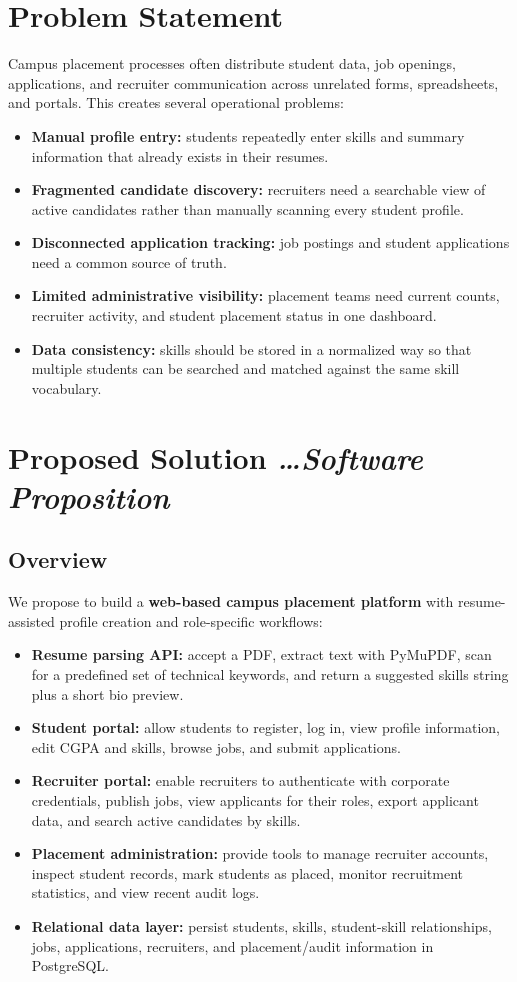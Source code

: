\documentclass[11pt,a4paper]{article}
\newcommand{\BvrHint}[1]{%
  {\normalfont\normalsize\itshape\hfill #1}}
\begin{document}
\section{Problem Statement}
Campus placement processes often distribute student data, job openings, applications, and recruiter communication across unrelated forms, spreadsheets, and portals. This creates several operational problems:
\begin{itemize}[leftmargin=0.7cm]
    \item \textbf{Manual profile entry:} students repeatedly enter skills and summary information that already exists in their resumes.
    \item \textbf{Fragmented candidate discovery:} recruiters need a searchable view of active candidates rather than manually scanning every student profile.
    \item \textbf{Disconnected application tracking:} job postings and student applications need a common source of truth.
    \item \textbf{Limited administrative visibility:} placement teams need current counts, recruiter activity, and student placement status in one dashboard.
    \item \textbf{Data consistency:} skills should be stored in a normalized way so that multiple students can be searched and matched against the same skill vocabulary.
\end{itemize}

\section{Proposed Solution\BvrHint{\ldots Software Proposition}}
\subsection{Overview}
We propose to build a \textbf{web-based campus placement platform} with resume-assisted profile creation and role-specific workflows:
\begin{itemize}[leftmargin=0.7cm]
    \item \textbf{Resume parsing API:} accept a PDF, extract text with PyMuPDF, scan for a predefined set of technical keywords, and return a suggested skills string plus a short bio preview.
    \item \textbf{Student portal:} allow students to register, log in, view profile information, edit CGPA and skills, browse jobs, and submit applications.
    \item \textbf{Recruiter portal:} enable recruiters to authenticate with corporate credentials, publish jobs, view applicants for their roles, export applicant data, and search active candidates by skills.
    \item \textbf{Placement administration:} provide tools to manage recruiter accounts, inspect student records, mark students as placed, monitor recruitment statistics, and view recent audit logs.
    \item \textbf{Relational data layer:} persist students, skills, student-skill relationships, jobs, applications, recruiters, and placement/audit information in PostgreSQL.
\end{itemize}
\end{document}
